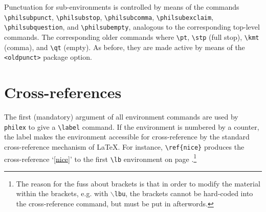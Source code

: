 \documentclass[11pt]{article}
\newcommand{\note}{\footnote}
\begin{document}
% 
% 


Punctuation for sub-environments  is controlled by means of the commands \verb+\philsubpunct+, \verb+\philsubstop+, \verb+\philsubcomma+, \verb+\philsubexclaim+, \verb+\philsubquestion+, and \verb+\philsubempty+, analogous to the corresponding top-level commands. The corresponding older commands where \verb+\pt+, \verb+\stp+ (full stop), \verb+\kmt+ (comma), and \verb+\qt+ (empty). As before, they are made active by means of the \verb+<oldpunct>+ package option.
	
\section{Cross-references}
The first (mandatory) argument of all environment commands are used by \verb+philex+ to give a \verb+\label+ command. If the environment is numbered by a counter, the label makes the environment accessible for cross-reference by the standard cross-reference mechanism of LaTeX. For instance, \verb+\ref{nice}+ produces the cross-reference `\ref{nice}' to the first \verb+\lb+ environment on page \pageref{nice}.\note
	{The reason for the fuss about brackets is that in order to modify the material within the brackets, e.g. with {\tt \(\backslash\)lbu}, the brackets cannot be hard-coded into the cross-reference command, but must be put in afterwords.}
	
\end{document}
